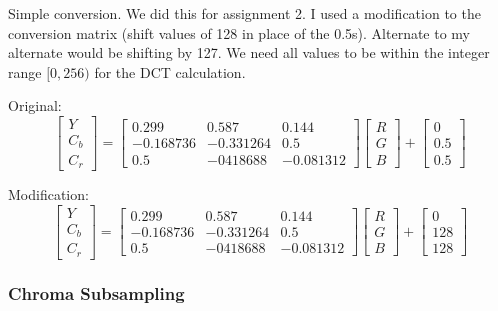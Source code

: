 \documentclass{article}
\begin{document}
Simple conversion.  We did this for assignment 2.  I used a modification to
the conversion matrix (shift values of 128 in place of the 0.5s).
Alternate to my alternate would be shifting by 127.
We need all values to be within the integer range $[0,256)$
for the DCT calculation.

Original:
\[
\begin{bmatrix}
Y \\
C_{b} \\
C_{r}
\end{bmatrix}
=
\begin{bmatrix}
0.299 & 0.587 & 0.144 \\
-0.168736 & -0.331264 & 0.5 \\
0.5 & -0418688 & -0.081312
\end{bmatrix}
\begin{bmatrix}
R \\
G \\
B
\end{bmatrix}
+
\begin{bmatrix}
0\\
0.5\\
0.5
\end{bmatrix}
\]


Modification:
\[
\begin{bmatrix}
Y \\
C_{b} \\
C_{r}
\end{bmatrix}
=
\begin{bmatrix}
0.299 & 0.587 & 0.144 \\
-0.168736 & -0.331264 & 0.5 \\
0.5 & -0418688 & -0.081312
\end{bmatrix}
\begin{bmatrix}
R \\
G \\
B
\end{bmatrix}
+
\begin{bmatrix}
0\\
128\\
128
\end{bmatrix}
\]


\subsubsection{Chroma Subsampling}
\end{document}
